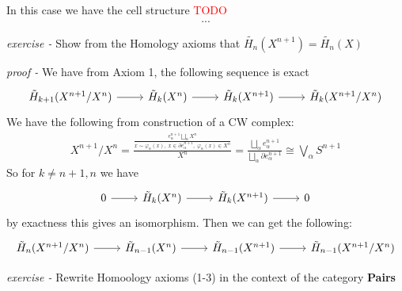 \documentclass[11pt]{article}
\theoremstyle{definition}
\begin{document}
    In this case we have the cell structure \textcolor{red}{TODO}
    \begin{align*}
        ...
    \end{align*}


    \emph{exercise - }\label{HEx14} Show from the Homology axioms that \(\tilde{H_n}(X^{n+1}) = \tilde{H_n}(X)\)

    \emph{proof - } We have from Axiom 1, the following sequence is exact
    \begin{equation*}
        \begin{tikzcd}
            \tilde{H}_{k+1}(X^{n+1}/X^n) \arrow[r] & \tilde{H}_{k}(X^n) \arrow[r] & \tilde{H}_{k}(X^{n+1}) \arrow[r] & \tilde{H}_{k}(X^{n+1}/X^n)
        \end{tikzcd}
    \end{equation*}
    We have the following from construction of a CW complex:
    \begin{align*}
        X^{n+1}/X^n = \frac{\frac{e_\alpha^{n+1} \bigsqcup_\alpha X^n}{x \sim \varphi_\alpha(x),\; x \in \partial e_\alpha^{n+1},\; \varphi_\alpha(x) \in X^n}}{X^n} = \frac{\bigsqcup_\alpha e_\alpha^{n+1}}{\bigsqcup_{\alpha}\partial e_\alpha^{n+1}} \cong \bigvee_\alpha S^{n+1}
    \end{align*}
    So for \(k \neq n+1,n\) we have
    \begin{equation*}
        \begin{tikzcd}
            0 \arrow[r] & \tilde{H}_{k}(X^n) \arrow[r] & \tilde{H}_{k}(X^{n+1}) \arrow[r] & 0
        \end{tikzcd}
    \end{equation*}
    by exactness this gives an isomorphism. Then we can get the following:
    \begin{equation*}
        \begin{tikzcd}
            \tilde{H}_{n}(X^{n+1}/X^n) \arrow[r] & \tilde{H}_{n-1}(X^n) \arrow[r] & \tilde{H}_{n-1}(X^{n+1}) \arrow[r] & \tilde{H}_{n-1}(X^{n+1}/X^n)
        \end{tikzcd}
    \end{equation*}
    


    \emph{exercise - }\label{HEx15} Rewrite Homoology axioms (1-3) in the context of the category \textbf{Pairs}
\end{document}
